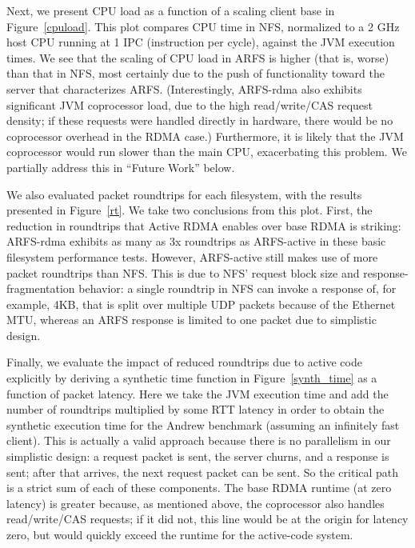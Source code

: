 \documentclass[10pt]{article}
\begin{document}
Next, we present CPU load as a function of a scaling client base in
Figure~\ref{cpuload}. This plot compares CPU time in NFS, normalized
to a 2 GHz host CPU running at 1 IPC (instruction per cycle), against
the JVM execution times. We see that the scaling of CPU load in ARFS
is higher (that is, worse) than that in NFS, most certainly due to the
push of functionality toward the server that characterizes
ARFS. (Interestingly, ARFS-rdma also exhibits significant JVM
coprocessor load, due to the high read/write/CAS request density; if
these requests were handled directly in hardware, there would be no
coprocessor overhead in the RDMA case.) Furthermore, it is likely that
the JVM coprocessor would run slower than the main CPU, exacerbating
this problem. We partially address this in ``Future Work'' below.

We also evaluated packet roundtrips for each filesystem, with the
results presented in Figure~\ref{rt}. We take two conclusions from
this plot. First, the reduction in roundtrips that Active RDMA enables
over base RDMA is striking: ARFS-rdma exhibits as many as 3x
roundtrips as ARFS-active in these basic filesystem performance
tests. However, ARFS-active still makes use of more packet roundtrips
than NFS. This is due to NFS' request block size and
response-fragmentation behavior: a single roundtrip in NFS can invoke
a response of, for example, 4KB, that is split over multiple UDP
packets because of the Ethernet MTU, whereas an ARFS response is
limited to one packet due to simplistic design.

Finally, we evaluate the impact of reduced roundtrips due to active
code explicitly by deriving a synthetic time function in
Figure~\ref{synth_time} as a function of packet latency. Here we take
the JVM execution time and add the number of roundtrips multiplied by
some RTT latency in order to obtain the synthetic execution time for
the Andrew benchmark (assuming an infinitely fast client). This is
actually a valid approach because there is no parallelism in our
simplistic design: a request packet is sent, the server churns, and a
response is sent; after that arrives, the next request packet can be
sent. So the critical path is a strict sum of each of these
components. The base RDMA runtime (at zero latency) is greater
because, as mentioned above, the coprocessor also handles
read/write/CAS requests; if it did not, this line would be at the
origin for latency zero, but would quickly exceed the runtime for the
active-code system.
\end{document}
